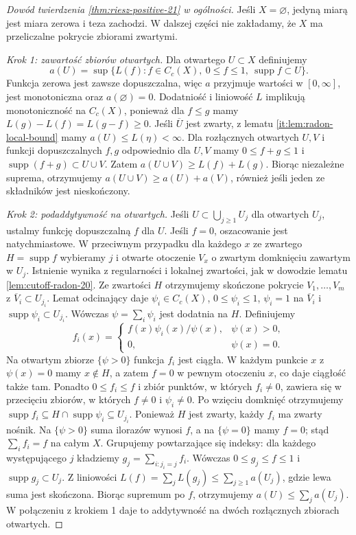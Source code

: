 \begin{proof}[Dowód twierdzenia \ref{thm:riesz-positive-21} w ogólności]
Jeśli $X=\varnothing$, jedyną miarą jest miara zerowa i teza zachodzi. W dalszej części nie zakładamy, że $X$ ma przeliczalne pokrycie zbiorami zwartymi.

\emph{Krok 1: zawartość zbiorów otwartych.}
Dla otwartego $U\subset X$ definiujemy
\begin{equation}\label{it:eq:radon-open-content-general}
 a(U)=\sup\{L(f): f\in C_c(X),\ 0\le f\le1,\
 \operatorname{supp}f\subset U\}.
\end{equation}
Funkcja zerowa jest zawsze dopuszczalna, więc $a$ przyjmuje wartości w $[0,\infty]$, jest monotoniczna oraz $a(\varnothing)=0$. Dodatniość i liniowość $L$ implikują monotoniczność na $C_c(X)$, ponieważ dla $f\le g$ mamy $L(g)-L(f)=L(g-f)\ge0$. Jeśli $\overline U$ jest zwarty, z lematu \ref{it:lem:radon-local-bound} mamy $a(U)\le L(\eta)<\infty$. Dla rozłącznych otwartych $U,V$ i funkcji dopuszczalnych $f,g$ odpowiednio dla $U,V$ mamy $0\le f+g\le1$ i $\operatorname{supp}(f+g)\subset U\cup V$. Zatem $a(U\cup V)\ge L(f)+L(g)$. Biorąc niezależne suprema, otrzymujemy $a(U\cup V)\ge a(U)+a(V)$, również jeśli jeden ze składników jest nieskończony.

\emph{Krok 2: podaddytywność na otwartych.}
Jeśli $U\subset\bigcup_{j\ge1}U_j$ dla otwartych $U_j$, ustalmy funkcję dopuszczalną $f$ dla $U$. Jeśli $f=0$, oszacowanie jest natychmiastowe. W przeciwnym przypadku dla każdego $x$ ze zwartego $H=\operatorname{supp}f$ wybieramy $j$ i otwarte otoczenie $V_x$ o zwartym domknięciu zawartym w $U_j$. Istnienie wynika z regularności i lokalnej zwartości, jak w dowodzie lematu \ref{lem:cutoff-radon-20}. Ze zwartości $H$ otrzymujemy skończone pokrycie $V_1,\ldots,V_m$ z $\overline V_i\subset U_{j_i}$. Lemat odcinający daje $\psi_i\in C_c(X)$, $0\le\psi_i\le1$, $\psi_i=1$ na $\overline V_i$ i $\operatorname{supp}\psi_i\subset U_{j_i}$. Wówczas $\psi=\sum_i\psi_i$ jest dodatnia na $H$. Definiujemy
\[
 f_i(x)=
 \begin{cases}
 f(x)\psi_i(x)/\psi(x),&\psi(x)>0,\\
 0,&\psi(x)=0.
 \end{cases}
\]
Na otwartym zbiorze $\{\psi>0\}$ funkcja $f_i$ jest ciągła. W każdym punkcie $x$ z $\psi(x)=0$ mamy $x\notin H$, a zatem $f=0$ w pewnym otoczeniu $x$, co daje ciągłość także tam. Ponadto $0\le f_i\le f$ i zbiór punktów, w których $f_i\ne0$, zawiera się w przecięciu zbiorów, w których $f\ne0$ i $\psi_i\ne0$. Po wzięciu domknięć otrzymujemy $\operatorname{supp}f_i\subseteq H\cap\operatorname{supp}\psi_i\subseteq U_{j_i}$. Ponieważ $H$ jest zwarty, każdy $f_i$ ma zwarty nośnik. Na $\{\psi>0\}$ suma ilorazów wynosi $f$, a na $\{\psi=0\}$ mamy $f=0$; stąd $\sum_i f_i=f$ na całym $X$. Grupujemy powtarzające się indeksy: dla każdego występującego $j$ kładziemy $g_j=\sum_{i:j_i=j}f_i$. Wówczas $0\le g_j\le f\le1$ i $\operatorname{supp}g_j\subset U_j$. Z liniowości $L(f)=\sum_jL(g_j)\le\sum_{j\ge1}a(U_j)$, gdzie lewa suma jest skończona. Biorąc supremum po $f$, otrzymujemy $a(U)\le\sum_ja(U_j)$. W połączeniu z krokiem 1 daje to addytywność na dwóch rozłącznych zbiorach otwartych.


\end{proof}
